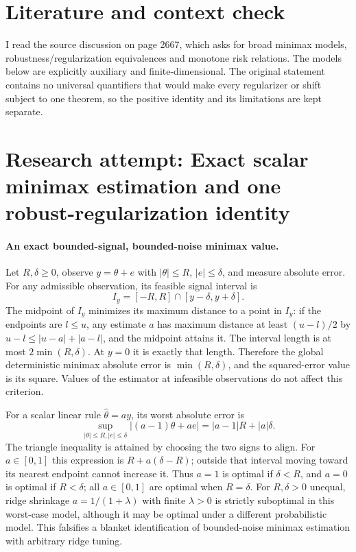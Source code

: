 \documentclass[11pt]{article}
\begin{document}
\section{Literature and context check}

I read the source discussion on page 2667, which asks for broad minimax models,
robustness/regularization equivalences and monotone risk relations. The models
below are explicitly auxiliary and finite-dimensional. The original statement
contains no universal quantifiers that would make every regularizer or shift
subject to one theorem, so the positive identity and its limitations are kept
separate.

\section{Research attempt: Exact scalar minimax estimation and one robust-regularization identity}

\paragraph{An exact bounded-signal, bounded-noise minimax value.}
Let $R,\delta\geq0$, observe $y=\theta+e$ with $|\theta|\leq R$,
$|e|\leq\delta$, and measure absolute error. For any admissible observation,
its feasible signal interval is
\[
 I_y=[-R,R]\cap[y-\delta,y+\delta].
\]
The midpoint of $I_y$ minimizes its maximum distance to a point in $I_y$:
if the endpoints are $l\leq u$, any estimate $a$ has maximum distance at
least $(u-l)/2$ by $u-l\leq|u-a|+|a-l|$, and the midpoint attains it.
The interval length is at most $2\min(R,\delta)$.
At $y=0$ it is exactly that length. Therefore the global deterministic minimax
absolute error is $\min(R,\delta)$, and the squared-error value is its square.
Values of the estimator at infeasible observations do not affect this criterion.

For a scalar linear rule $\widehat\theta=ay$, its worst absolute error is
\[
 \sup_{|\theta|\leq R,|e|\leq\delta}|(a-1)\theta+ae|
 =|a-1|R+|a|\delta.
\]
The triangle inequality is attained by choosing the two signs to align.
For $a\in[0,1]$ this expression is $R+a(\delta-R)$; outside that interval
moving toward its nearest endpoint cannot increase it.
Thus $a=1$ is optimal if $\delta<R$, and $a=0$ is optimal if $R<\delta$;
all $a\in[0,1]$ are optimal when $R=\delta$.
For $R,\delta>0$ unequal, ridge shrinkage $a=1/(1+\lambda)$ with finite
$\lambda>0$ is strictly suboptimal in this worst-case model, although it may
be optimal under a different probabilistic model. This falsifies a blanket
identification of bounded-noise minimax estimation with arbitrary ridge tuning.
\end{document}
